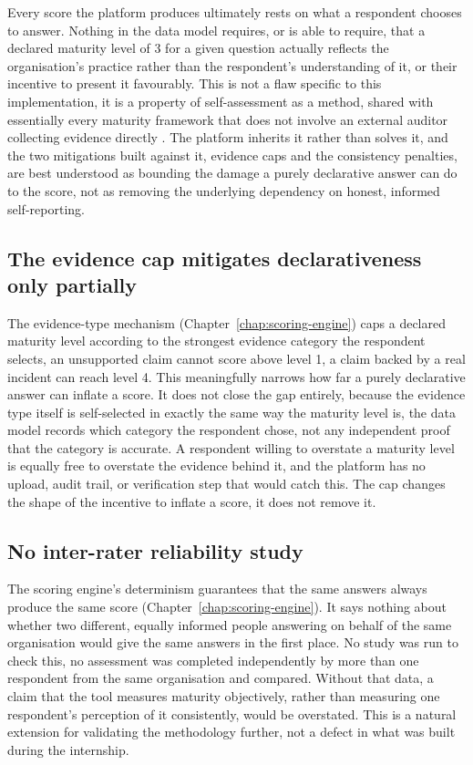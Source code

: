 Every score the platform produces ultimately rests on what a respondent
chooses to answer. Nothing in the data model requires, or is able to require,
that a declared maturity level of 3 for a given question actually reflects
the organisation's practice rather than the respondent's understanding of it,
or their incentive to present it favourably. This is not a flaw specific to
this implementation, it is a property of self-assessment as a method, shared
with essentially every maturity framework that does not involve an external
auditor collecting evidence directly \cite{isaca_cmmi_cybermaturity,
cisacrr}. The platform inherits it rather than solves it, and the two
mitigations built against it, evidence caps and the consistency penalties,
are best understood as bounding the damage a purely declarative answer can
do to the score, not as removing the underlying dependency on honest,
informed self-reporting.

\subsection{The evidence cap mitigates declarativeness only partially}
\label{sec:validation-evidence-cap-limitation}

The evidence-type mechanism (Chapter~\ref{chap:scoring-engine}) caps a declared
maturity level according to the strongest evidence category the respondent
selects, an unsupported claim cannot score above level 1, a claim backed by a
real incident can reach level 4. This meaningfully narrows how far a purely
declarative answer can inflate a score. It does not close the gap entirely,
because the evidence type itself is self-selected in exactly the same way
the maturity level is, the data model records which category the respondent
chose, not any independent proof that the category is accurate. A respondent
willing to overstate a maturity level is equally free to overstate the
evidence behind it, and the platform has no upload, audit trail, or
verification step that would catch this. The cap changes the shape of the
incentive to inflate a score, it does not remove it.

\subsection{No inter-rater reliability study}
\label{sec:validation-interrater-limitation}

The scoring engine's determinism guarantees that the same answers always
produce the same score (Chapter~\ref{chap:scoring-engine}). It says nothing about
whether two different, equally informed people answering on behalf of the
same organisation would give the same answers in the first place. No study
was run to check this, no assessment was completed independently by more
than one respondent from the same organisation and compared. Without that
data, a claim that the tool measures maturity objectively, rather than
measuring one respondent's perception of it consistently, would be
overstated. This is a natural extension for validating the methodology
further, not a defect in what was built during the internship.

